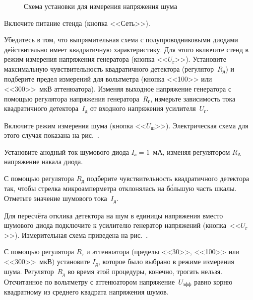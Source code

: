 \begin{figure}[h!]
    \centering\small
	\caption{Схема установки для измерения напряжения шума}
\end{figure}

\begin{lab:task}


	\item Включите питание стенда (кнопка <<Сеть>>).

	\item Убедитесь в том, что выпрямительная схема с полупроводниковыми диодами
действительно имеет квадратичную
характеристику. Для этого включите стенд в режим измерения напряжения генератора
(кнопка <<$U_{\text{г}}$>>). Установите
максимальную  чувствительность квадратичного детектора
(регулятор~$R_{\text{д}}$) и подберите предел измерений для вольтметра
(кнопка <<100>> или <<300>>~мкВ аттенюатора). Изменяя выходное напряжение
генератора с помощью регулятора напряжения генератора~$R_{г}$, 
измерьте зависимость тока квадратичного детектора~$I_{\text{д}}$ 
от входного напряжения усилителя~$U_{\text{г}}$.


	\item Включите режим измерения шума (кнопка <<$U_{ш}$>>).
Электрическая схема для этого случая показана на рис.~.

	\item Установите анодный ток шумового диода $I_{а}=1$~мА, изменяя
регулятором $R_{А}$ напряжение накала диода.

С помощью регулятора $R_{д}$ подберите чувствительность квадратичного
детектора так, чтобы стрелка микроамперметра
отклонялась на б\'{о}льшую часть шкалы. Отметьте значение шумового
тока~$I_{д}$.

Для пересчёта отклика детектора на шум в единицы напряжения вместо шумового
диода подключите к усилителю генератор напряжений (кнопка~<<$U_{г}$>>).
Измерительная схема приведена на рис.~.

С помощью регулятора $R_{г}$ и аттенюатора (пределы <<30>>, <<100>> или
<<300>>~мкВ) установите  $I_{д}$,
которое было выбрано в режиме измерения шума. Регулятор~$R_{д}$ во время
этой процедуры, конечно, трогать нельзя. Отсчитанное по вольтметру
с аттенюатором напряжение~$U_{эфф}$ равно корню квадратному из среднего
квадрата напряжения шумов.


\end{lab:task}
